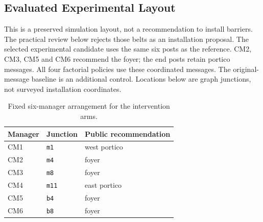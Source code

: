 \subsection{Evaluated Experimental Layout}

This is a preserved simulation layout, not a recommendation to install barriers. The practical review below rejects those belts as an installation proposal. The selected experimental candidate uses the same six posts as the reference. CM2, CM3, CM5 and CM6 recommend the foyer; the end posts retain portico messages. All four factorial policies use these coordinated messages. The original-message baseline is an additional control. Locations below are graph junctions, not surveyed installation coordinates.

\begin{table}[htbp]\centering\small

\begin{tabular}{lll}\toprule

Manager & Junction & Public recommendation\\\midrule

CM1 & \texttt{m1} & west portico\\

CM2 & \texttt{m4} & foyer\\

CM3 & \texttt{m8} & foyer\\

CM4 & \texttt{m11} & east portico\\

CM5 & \texttt{b4} & foyer\\

CM6 & \texttt{b8} & foyer\\

\bottomrule\end{tabular}\caption{Fixed six-manager arrangement for the intervention arms.}\end{table}

